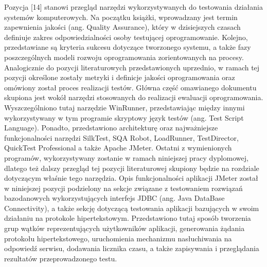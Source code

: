 Pozycja [14] stanowi przegląd narzędzi wykorzystywanych do testowania działania systemów komputerowych. Na początku książki, wprowadzany jest termin zapewnienia jakości (ang. Quality Assurance), który w dzisiejszych czasach definiuje zakres odpowiedzialności osoby testującej oprogramowanie. Kolejno, przedstawiane są kryteria sukcesu dotyczące tworzonego systemu, a także fazy poszczególnych modeli rozwoju oprogramowania zorientowanych na procesy. Analogicznie do pozycji literaturowych przedstawionych uprzednio, w ramach tej pozycji określone zostały metryki i definicje jakości oprogramowania oraz omówiony został proces realizacji testów. Główna część omawianego dokumentu skupiona jest wokół narzędzi stosowanych do realizacji ewaluacji oprogramowania. Wyszczególniono tutaj narzędzie WinRunner, przedstawiając między innymi wykorzystywany w tym programie skryptowy język testów (ang. Test Script Language). Ponadto, przedstawiono architekturę oraz najważniejsze funkcjonalności narzędzi SilkTest, SQA Robot, LoadRunner, TestDirector, QuickTest Professional a także Apache JMeter. Ostatni z wymienionych programów, wykorzystywany zostanie w ramach niniejszej pracy dyplomowej, dlatego też dalszy przegląd tej pozycji literaturowej skupiony będzie na rozdziale dotyczącym właśnie tego narzędzia. Opis funkcjonalności aplikacji JMeter został w niniejszej pozycji podzielony na sekcje związane z testowaniem rozwiązań bazodanowych wykorzystujących interfejs JDBC (ang. Java DataBase Connectivity), a także sekcję dotyczącą testowania aplikacji bazujących w swoim działaniu na protokole hipertekstowym. Przedstawiono tutaj sposób tworzenia grup wątków reprezentujących użytkowników aplikacji, generowania żądania protokołu hipertekstowego, uruchomienia mechanizmu nasłuchiwania na odpowiedź serwisu, dodawania licznika czasu, a także zapisywania i przeglądania rezultatów przeprowadzonego testu.

